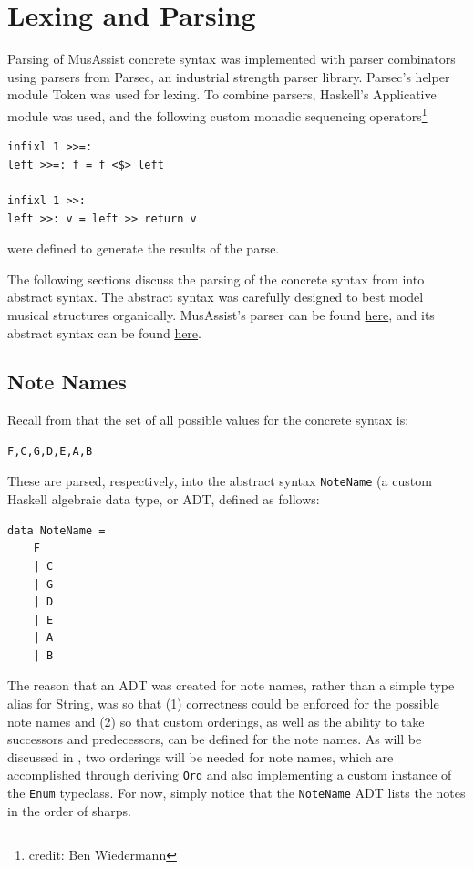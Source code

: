 \documentclass{report}
\newcommand\param[1]{\textttu{<#1>}}
\begin{document}
\chapter{Lexing and Parsing}

Parsing of MusAssist concrete syntax was implemented with parser combinators using parsers from Parsec, an industrial strength parser library. Parsec's helper module Token was used for lexing. To combine parsers, Haskell's Applicative module was used, and the following custom monadic sequencing operators\footnote{credit: Ben Wiedermann}
\begin{verbatim}
infixl 1 >>=:
left >>=: f = f <$> left

infixl 1 >>:
left >>: v = left >> return v
\end{verbatim}

were defined to generate the results of the parse.

The following sections discuss the parsing of the concrete syntax from  into abstract syntax. The abstract syntax was carefully designed to best model musical structures organically. MusAssist's parser can be found \href{https://github.com/ilanashapiro/MusAssist/blob/main/app/Parser.hs}{here}, and its abstract  syntax can be found \href{https://github.com/ilanashapiro/MusAssist/blob/main/app/MusAssistAST.hs}{here}.
\section{Note Names}
Recall from  that the set of all possible values for the concrete syntax \param{NOTENAME} is:
\begin{verbatim}
F,C,G,D,E,A,B
\end{verbatim}

These are parsed, respectively, into the abstract syntax \verb.NoteName. (a custom Haskell algebraic data type, or ADT, defined as follows:
\newpage
\begin{verbatim}
data NoteName = 
    F
    | C
    | G 
    | D 
    | E 
    | A 
    | B
\end{verbatim}

The reason that an ADT was created for note names, rather than a simple type alias for String, was so that (1) correctness could be enforced for the possible note names and (2) so that custom orderings, as well as the ability to take  successors and predecessors, can be defined for the note names. As will be discussed in , two orderings will be needed for note names, which are accomplished through deriving \verb.Ord. and also implementing a custom instance of the \verb.Enum. typeclass. For now, simply notice that the \verb.NoteName. ADT lists the notes in the order of sharps.
\end{document}
